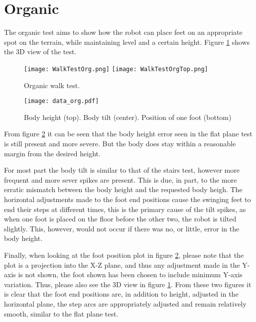     \section{Organic}
    The organic test aims to show how the robot can place feet on an appropriate spot on the terrain, while maintaining level and a certain height. Figure \ref{fig:org_test} shows the
    3D view of the test.
    \begin{figure}[h]
        \centering
        \texttt{[image: WalkTestOrg.png]}
        \texttt{[image: WalkTestOrgTop.png]}
        \caption{Organic walk test.}
        \label{fig:org_test}
    \end{figure}
    \begin{figure}[h]
        \centering
        \texttt{[image: data\_org.pdf]}
        \caption{Body height (top). Body tilt (center). Position of one foot (bottom)}
        \label{fig:org_test_data}
    \end{figure}

    \noindent
    From figure \ref{fig:org_test_data} it can be seen that the body height error seen in the flat plane test
    is still present and more severe. But the body does stay within a reasonable margin from the desired height.

    For most part the body tilt is similar to that of the stairs test, however more frequent and more sever spikes are present.
    This is due, in part, to the more erratic mismatch between the body height and the requested body heigh. The horizontal adjustments made to 
    the foot end positions cause the swinging feet to end their steps at different times, this is the primary cause of the tilt spikes, as when one
    foot is placed on the floor before the other two, the robot is tilted slightly. This, however, would not occur if there was no, or little, 
    error in the body height.

    Finally, when looking at the foot position plot in figure \ref{fig:org_test_data}, please note that the plot is a projection into the X-Z plane, and thus any
    adjustment made in the Y-axis is not shown, the foot shown has been chosen to include minimum Y-axis variation. 
    Thus, please also see the 3D view in figure \ref{fig:org_test}. From these two figures it is clear that the foot end positions are, in addition to height,
    adjusted in the horizontal plane, the step arcs are appropriately adjusted and remain relatively smooth, similar to the flat plane test.



